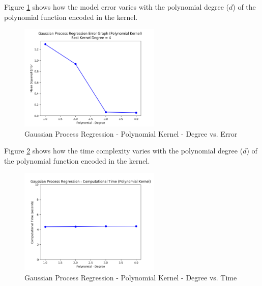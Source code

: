 \documentclass[parskip=full]{scrartcl}
\begin{document}
            Figure \ref{fig:gpr_polynomial_degree_vs_error} shows how the model error varies with the polynomial degree ($d$) of the polynomial function encoded in the kernel.

            \begin{figure}[ht]
                \centering
                \includegraphics[width=0.6\textwidth]{3c_gpr_polynomial_degree_vs_error.png}
                \caption{Gaussian Process Regression - Polynomial Kernel - Degree vs. Error}
                \label{fig:gpr_polynomial_degree_vs_error}
            \end{figure}

            Figure \ref{fig:gpr_polynomial_degree_vs_time} shows how the time complexity varies with the polynomial degree ($d$) of the polynomial function encoded in the kernel.

            \begin{figure}[ht]
                \centering
                \includegraphics[width=0.6\textwidth]{3c_gpr_polynomial_degree_vs_time.png}
                \caption{Gaussian Process Regression - Polynomial Kernel - Degree vs. Time}
                \label{fig:gpr_polynomial_degree_vs_time}
            \end{figure}
        
\end{document}
